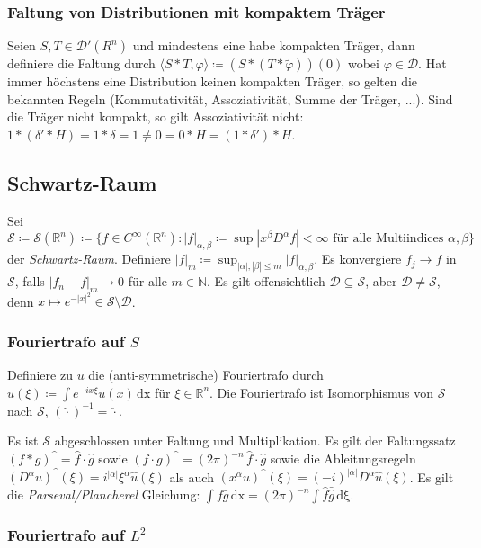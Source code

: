 \documentclass[11pt,a4paper]{scrartcl}
\newcommand{\N}{\mathbb{N}} %
\newcommand{\R}{\mathbb{R}} %
\newcommand{\D}{\mathcal{D}}
\newcommand{\Sc}{\mathcal{S}}
\newcommand{\circum}{\text{\textasciicircum}}
\theoremstyle{plain}
\theoremstyle{definition}
\theoremstyle{remark}
\begin{document}
\subsubsection{Faltung von Distributionen mit kompaktem Träger}

Seien $S,T\in \D'(R^n)$ und mindestens eine habe kompakten Träger, dann definiere die Faltung durch $\langle S*T, \varphi \rangle \coloneqq (S*(T*\tilde\varphi))(0)$ wobei $\varphi\in\D$. Hat immer höchstens eine Distribution keinen kompakten Träger, so gelten die bekannten Regeln (Kommutativität, Assoziativität, Summe der Träger, ...).  Sind die Träger nicht kompakt, so gilt Assoziativität nicht: $1*(\delta'*H)=1*\delta=1\neq 0=0*H=(1*\delta')*H$.

\subsection{Schwartz-Raum}

Sei $\Sc\coloneqq \Sc(\R^n)\coloneqq \{ f\in C^\infty(\R^n): |f|_{\alpha,\beta} \coloneqq \sup |x^\beta D^\alpha f| < \infty \text{ für alle Multiindices } \alpha, \beta \}$ der \emph{Schwartz-Raum}. Definiere $|f|_m \coloneqq \sup_{|\alpha|,|\beta| \leq m} |f|_{\alpha,\beta}$. Es konvergiere $f_j \to f$ in $\Sc$, falls $|f_n-f|_m \to 0$ für alle $m\in \N$. Es gilt offensichtlich $\D \subseteq \Sc$, aber $\D \neq \Sc$, denn $x\mapsto e^{-|x|^2} \in \Sc\setminus \D$.


\subsubsection{Fouriertrafo auf $S$}

Definiere zu $u$ die (anti-symmetrische) Fouriertrafo durch $\hat u(\xi)\coloneqq \int e^{-ix\xi}u(x) \, \mathrm{dx}$ für $\xi\in\R^n$. Die Fouriertrafo ist Isomorphismus von $\Sc$ nach $\Sc$, $(\hat \cdot )^{-1} = \check\cdot$.

Es ist $\Sc$ abgeschlossen unter Faltung und Multiplikation. Es gilt der Faltungssatz $(f*g)^{\mbox{\textasciicircum}} = \hat f \cdot \hat g$ sowie $(f\cdot g)^{\mbox{\textasciicircum}} = (2\pi)^{-n} \, \hat f \cdot \hat g$ sowie die Ableitungsregeln $(D^\alpha u)^\circum(\xi) = i^{|\alpha|} \xi^\alpha \hat u(\xi)$ als auch $(x^\alpha u)^\circum(\xi) = (-i)^{|\alpha|} D^\alpha \hat u(\xi)$. Es gilt die \emph{Parseval/Plancherel} Gleichung: $\int f\bar g \, \mathrm{dx} = (2\pi)^{-n} \int \hat f \bar{\hat g} \, \mathrm{d\xi}$.

\subsubsection{Fouriertrafo auf $L^2$}
\end{document}
